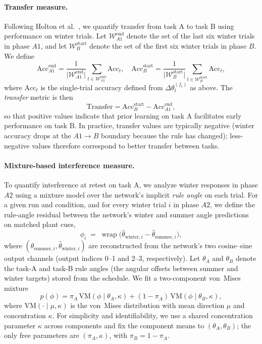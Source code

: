 \paragraph{Transfer measure.}
Following Holton et al.~\cite{holton2025humans}, we quantify transfer from task A to task B using performance on winter trials. Let $\mathcal{W}_{A1}^{\text{end}}$ denote the set of the last six winter trials in phase $A1$, and let $\mathcal{W}_{B}^{\text{start}}$ denote the set of the first six winter trials in phase $B$. We define
\[
\mathrm{Acc}_{A1}^{\text{end}} = \frac{1}{\lvert \mathcal{W}_{A1}^{\text{end}} \rvert} \sum_{t \in \mathcal{W}_{A1}^{\text{end}}} \mathrm{Acc}_t,
\quad
\mathrm{Acc}_{B}^{\text{start}} = \frac{1}{\lvert \mathcal{W}_{B}^{\text{start}} \rvert} \sum_{t \in \mathcal{W}_{B}^{\text{start}}} \mathrm{Acc}_t,
\]
where $\mathrm{Acc}_t$ is the single-trial accuracy defined from $\Delta \theta_t^{(f_t)}$ as above. The \emph{transfer} metric is then
\[
\mathrm{Transfer} = \mathrm{Acc}_{B}^{\text{start}} - \mathrm{Acc}_{A1}^{\text{end}},
\]
so that positive values indicate that prior learning on task A facilitates early performance on task B. In practice, transfer values are typically negative (winter accuracy drops at the $A1 \rightarrow B$ boundary because the rule has changed); less-negative values therefore correspond to better transfer between tasks.

\paragraph{Mixture-based interference measure.}
To quantify interference at retest on task A, we analyze winter responses in phase $A2$ using a mixture model over the network's implicit \emph{rule angle} on each trial. For a given run and condition, and for every winter trial $i$ in phase $A2$, we define the rule-angle residual between the network's winter and summer angle predictions on matched plant cues,
\[
\phi_i \;=\; \operatorname{wrap}\!\big( \hat{\theta}_{\text{winter},i} - \hat{\theta}_{\text{summer},i} \big),
\]
where $(\hat{\theta}_{\text{summer},i}, \hat{\theta}_{\text{winter},i})$ are reconstructed from the network's two cosine--sine output channels (output indices 0--1 and 2--3, respectively). Let $\theta_A$ and $\theta_B$ denote the task-A and task-B rule angles (the angular offsets between summer and winter targets) stored from the schedule. We fit a two-component von~Mises mixture
\[
p(\phi) = \pi_A \, \mathrm{VM}(\phi \mid \theta_A, \kappa) + (1 - \pi_A) \, \mathrm{VM}(\phi \mid \theta_B, \kappa),
\]
where $\mathrm{VM}(\cdot \mid \mu, \kappa)$ is the von~Mises distribution with mean direction $\mu$ and concentration $\kappa$. For simplicity and identifiability, we use a shared concentration parameter $\kappa$ across components and fix the component means to $(\theta_A, \theta_B)$; the only free parameters are $(\pi_A, \kappa)$, with $\pi_B = 1 - \pi_A$.

